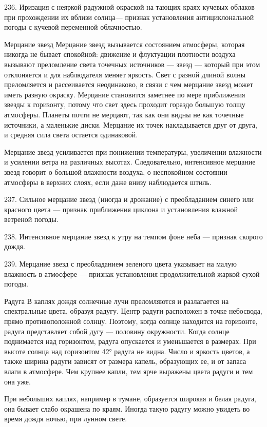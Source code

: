 236. Иризация с неяркой радужной окраской на тающих краях кучевых облаков при прохождении их вблизи солнца— признак установления антициклональной погоды с кучевой переменной облачностью.

Мерцание звезд
Мерцание звезд вызывается состоянием атмосферы, которая никогда не бывает спокойной: движение и флуктуации плотности воздуха вызывают преломление света точечных источников --- звезд --- который при этом отклоняется и для наблюдателя меняет яркость. Свет с разной длиной волны преломляется и рассеивается неодинаково, в связи с чем мерцание звезд может иметь разную окраску. Мерцание становится заметнее по мере приближения звезды к горизонту, потому что свет здесь проходит гораздо большую толщу атмосферы. Планеты почти не мерцают, так как они видны не как точечные источники, а маленькие диски. Мерцание их точек накладывается друг от друга, и средняя сила света остается одинаковой.

Мерцание звезд усиливается при понижении температуры, увеличении влажности и усилении ветра на различных высотах. Следовательно, интенсивное мерцание звезд говорит о большой влажности воздуха, о неспокойном состоянии атмосферы в верхних слоях, если даже внизу наблюдается штиль.

237. Сильное мерцание звезд (иногда и дрожание) с преобладанием синего или красного цвета — признак приближения циклона и установления влажной ветреной погоды.

238. Интенсивное мерцание звезд к утру на темпом фоне неба — признак скорого дождя.

239. Мерцание звезд с преобладанием зеленого цвета указывает на малую влажность в атмосфере — признак установления продолжительной жаркой сухой погоды.

Радуга
В каплях дождя солнечные лучи преломляются и разлагается на спектральные цвета, образуя радугу. Центр радуги расположен в точке небосвода, прямо противоположной солнцу. Поэтому, когда солнце находится на горизонте, радуга представляет собой дугу — половину окружности. Когда солнце поднимается над горизонтом, радуга опускается и уменьшается в размерах. При высоте солнца над горизонтом 42° радуга не видна. Число и яркость цветов, а также ширина радуги зависят от размера капель, образующих ее, и от запаса влаги в атмосфере. Чем крупнее капли, тем ярче выражены цвета радуги и тем она уже.

При небольших каплях, например в тумане, образуется широкая и белая радуга, она бывает слабо окрашена по краям. Иногда такую радугу можно увидеть во время дождя ночью, при лунном свете.

